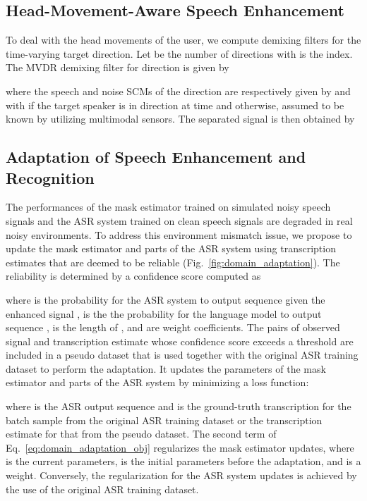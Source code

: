 \documentclass[a4paper]{article}
\begin{document}
\subsection{Head-Movement-Aware Speech Enhancement} \label{sec:head_movement}

To deal with the head movements of the user, we compute demixing filters for the time-varying target direction.
Let  be the number of directions with 
 is the index.
The MVDR demixing filter for direction  is given by

where
 the speech and noise SCMs of the direction  are respectively given by
 and
 with
 if the target speaker is in direction  at time 
and  otherwise,
assumed to be known by utilizing multimodal sensors.
The separated signal  is then obtained by


\subsection{Adaptation of Speech Enhancement and Recognition}
\label{sec:domain_adaptation}

The performances of
the mask estimator trained on simulated noisy speech signals and
the ASR system trained on clean speech signals
are degraded in real noisy environments.
To address this environment mismatch issue,
we propose to update the mask estimator and parts of the ASR system
using transcription estimates that are deemed to be reliable
(Fig.~\ref{fig:domain_adaptation}).
The reliability is determined by a confidence score  computed as 

where  is the probability for the ASR system
to output sequence  given the enhanced signal ,
 is the the probability for the language model to output sequence ,
 is the length of ,
and 
are weight coefficients.
The pairs of observed signal and transcription estimate
whose confidence score exceeds a threshold 
are included in a pseudo dataset
that is used together with the original ASR training dataset to perform the adaptation.
It updates the parameters of the mask estimator and parts of the ASR system 
by minimizing a loss function:

where  is the ASR output sequence and
 is
the ground-truth transcription for the batch sample from the original ASR training dataset or the transcription estimate for that from the pseudo dataset.
The second term of Eq.~\eqref{eq:domain_adaptation_obj}
regularizes the mask estimator updates,
where
 is the current parameters,
 is the initial parameters before the adaptation,
and  is a weight.
Conversely, the regularization for the ASR system updates is achieved by the use of the original ASR training dataset.
\end{document}
